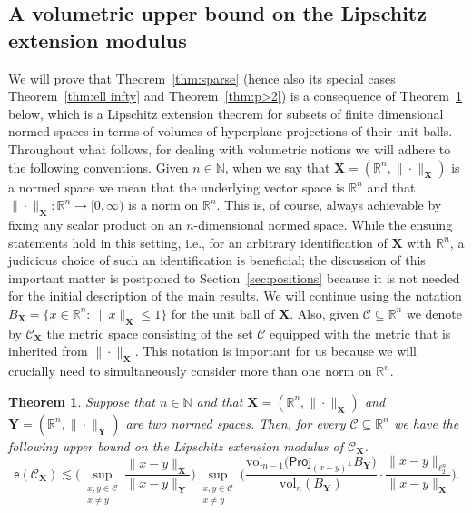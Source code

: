 \documentclass[11pt,reqno]{amsart}
\renewcommand{\le}{\leqslant}
\newcommand{\proj}{\mathsf{Proj}}
\newcommand{\X}{\mathbf X}
\newcommand{\Y}{\mathbf Y}
\newcommand{\R}{\mathbb R}
\newtheorem{theorem}{Theorem}
\theoremstyle{remark}
\renewcommand{\subset}{\subseteq}
\newcommand{\N}{\mathbb N}
\newcommand{\ee}{\mathsf{e}}
\newcommand{\sub}{\mathscr{C}}
\newcommand{\vol}{\mathrm{vol}}
\renewcommand{\1}{\mathbf 1}
\begin{document}
\subsection{A volumetric upper bound on the Lipschitz extension modulus}\label{sec:volumetric ext} We will prove that Theorem~\ref{thm:sparse} (hence also its special cases Theorem~\ref{thm:ell infty} and Theorem~\ref{thm:p>2})
is a consequence of Theorem~\ref{thm:XY version ext} below,  which is a Lipschitz extension theorem for subsets of finite dimensional normed spaces in terms of volumes of hyperplane projections of their unit balls. Throughout what follows, for dealing with volumetric notions we will adhere to the following conventions. Given $n\in \N$, when we say that $\X=(\R^n,\|\cdot\|_{\X})$ is a normed space we mean that the underlying vector space is $\R^n$ and that $\|\cdot\|_{\X}:\R^n\to [0,\infty)$ is a norm on $\R^n$. This is, of course, always achievable by fixing any scalar product on an $n$-dimensional normed space. While the ensuing statements hold in this setting, i.e., for an {arbitrary} identification of $\X$ with $\R^n$, a judicious choice of such an identification  is  beneficial; the discussion of this important matter is postponed to Section~\ref{sec:positions} because it is not needed for the initial description of the main results. We will continue using the notation $B_{\X}=\{x\in \R^n:\ \|x\|_{\X}\le 1\}$ for the unit ball of $\X$. Also, given $\sub\subset \R^n$ we denote by $\sub_{\X}$ the metric space consisting of the set $\sub$ equipped with the metric that is inherited from $\|\cdot\|_{\X}$. This notation is important for us because we will crucially need to simultaneously consider more than one  norm on $\R^n$.


\begin{theorem}\label{thm:XY version ext} Suppose that $n\in \N$ and that $\X=(\R^n,\|\cdot\|_{\X})$ and $\Y=(\R^n,\|\cdot\|_{\Y})$ are two normed spaces.  Then, for every $\sub\subset \R^n$ we have the following upper bound on the Lipschitz extension modulus of $\sub_\X$.
\begin{equation}\label{eq:ext XY version}
\ee(\sub_{\X})\lesssim  \bigg( \sup_{\substack{x,y\in \sub\\x\neq y}}\frac{\|x-y\|_{\X}}{\|x-y\|_{\Y}}\bigg)\sup_{\substack{x,y\in \sub\\x\neq y}} \bigg( \frac{\vol_{n-1}\big(\proj_{(x-y)^\perp}B_{\Y}\big)}{\vol_n(B_{\Y})}\cdot \frac{\|x-y\|_{\ell_2^n}}{\|x-y\|_{\X}}\bigg).
\end{equation}
\end{theorem}
\end{document}
